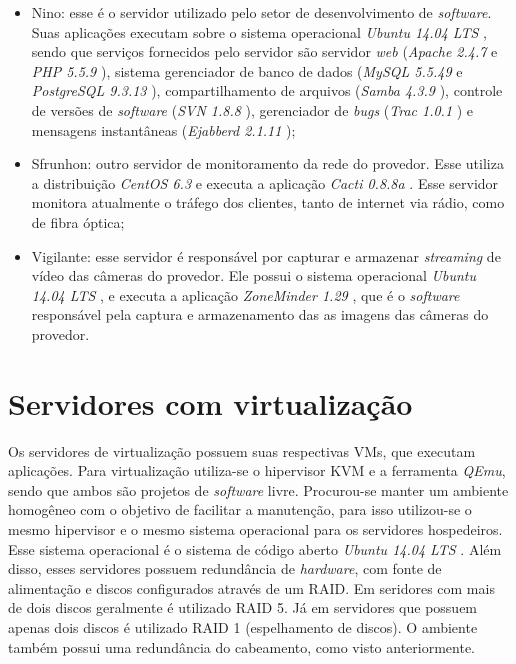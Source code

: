 \begin{itemize}
 \item Nino: esse é o servidor utilizado pelo setor de desenvolvimento de \textit{software}. Suas aplicações executam sobre o sistema operacional 
 \textit{Ubuntu 14.04 \ac{LTS}} \cite{ubuntu}, sendo que serviços fornecidos pelo servidor são servidor \textit{web} (\textit{Apache 2.4.7} 
 \cite{apache} e \textit{\ac{PHP} 5.5.9} \cite{php}), sistema gerenciador de banco de dados (\textit{MySQL 5.5.49} \cite{mysql} e 
 \textit{PostgreSQL 9.3.13} \cite{postgres}), compartilhamento de arquivos (\textit{Samba 4.3.9} \cite{samba}), controle de versões de 
 \textit{software} (\textit{\ac{SVN} 1.8.8} \cite{svn}), gerenciador de \textit{bugs} (\textit{Trac 1.0.1} \cite{trac}) e mensagens instantâneas 
 (\textit{Ejabberd 2.1.11} \cite{ejabberd});
 
 \item Sfrunhon: outro servidor de monitoramento da rede do provedor. Esse utiliza a distribuição \textit{CentOS 6.3} \cite{centos} e executa a 
 aplicação \textit{Cacti 0.8.8a} \cite{cacti}. Esse servidor monitora atualmente o tráfego dos clientes, tanto de internet via rádio, como de 
 fibra óptica;
 
 \item Vigilante: esse servidor é responsável por capturar e armazenar \textit{streaming} de vídeo das câmeras do provedor. Ele possui o sistema 
 operacional \textit{Ubuntu 14.04 \ac{LTS}} \cite{ubuntu}, e executa a aplicação \textit{ZoneMinder 1.29} \cite{zoneminder}, que é o 
 \textit{software} responsável pela captura e armazenamento das as imagens das câmeras do provedor.
\end{itemize}

\section{Servidores com virtualização}
\label{section:servvirt}

Os servidores de virtualização possuem suas respectivas \ac{VM}s, que executam aplicações. Para virtualização utiliza-se o hipervisor 
\ac{KVM} e a ferramenta \textit{QEmu}, sendo que ambos são projetos de \textit{software} livre. Procurou-se manter um ambiente homogêneo 
com o objetivo de facilitar a manutenção, para isso utilizou-se o mesmo hipervisor e o mesmo sistema operacional para os servidores hospedeiros. 
Esse sistema operacional é o sistema de código aberto \textit{Ubuntu 14.04 \ac{LTS}} \cite{ubuntu}.
Além disso, esses servidores possuem redundância de \textit{hardware}, com fonte de alimentação e discos configurados através de um \ac{RAID}. 
Em seridores com mais de dois discos geralmente é utilizado \ac{RAID} 5. Já em servidores que possuem apenas dois discos é utilizado \ac{RAID} 1 
(espelhamento de discos). O ambiente também possui uma redundância do cabeamento, como visto anteriormente.

